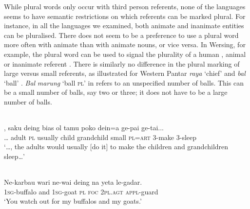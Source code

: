 While plural words only occur with third person referents, none of the languages seems to have semantic restrictions on which referents can be marked plural. For instance, in all the languages we examined, both animate and inanimate entities can be pluralised. There does not seem to be a preference to use a plural word more often with animate than with animate nouns, or vice versa. In Wersing, for example, the plural word can be used to signal the plurality of a human , animal  or inanimate referent . There is similarly no difference in the plural marking of large versus small referents, as illustrated for Western Pantar \textit{raya} `chief'  and \textit{bal} `ball' . \textit{Bal} \textit{marung} `ball \textsc{pl'} in  refers to an unspecified number of balls. This can be a small number of balls, say two or three; it does not have to be a large number of balls.




\ea%
\label{ex:9:3}
 \\
\gll  {\dots}, saku deing bias ol tamu poko dein=a ge-pai ge-tai...\\
  {\dots} adult \textsc{pl} usually child grandchild small \textsc{pl=art} \textsc{3-}make 3-sleep\\
\glt `{\dots}, the adults would usually [do it] to make the children and grandchildren sleep{\dots}'
\z








\ea%
\label{ex:9:4}
 \\
\gll Ne-karbau wari ne-wai deing na yeta le-gadar.{\footnotemark}\\
  \textsc{1sg}\textsc{-}buffalo and \textsc{1sg-}goat \textsc{pl} \textsc{foc} \textsc{2pl.agt} \textsc{appl-}guard\\
\glt `You watch out for my buffalos and my goats.' 
\z
{}







